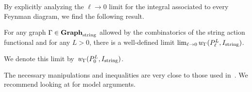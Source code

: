 \subsubsection{}

By explicitly analyzing the $\ell \to 0$ limit for the integral associated to every Feynman diagram,
we find the following result.

\begin{prop}
For any graph $\Gamma \in {\bf Graph}_{\rm string}$ allowed by the combinatorics of the string action functional and for any $L > 0$,
there is a well-defined limit $\lim_{\ell \to 0} w_{\Gamma}(P_{\ell}^L,I_{\rm string})$.
\end{prop}

We denote this limit by~$w_{\Gamma}(P_{0}^L,I_{\rm string})$.

The necessary manipulations and inequalities are very close to those used in~\cite{}.
We recommend looking at  for model arguments. 


